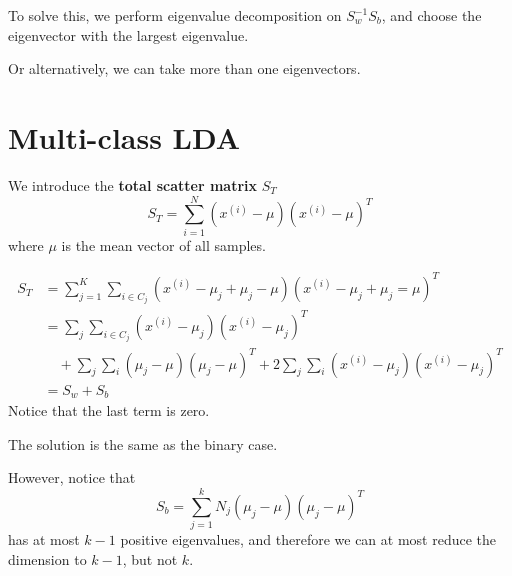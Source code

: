         To solve this, we perform eigenvalue decomposition on $S_w^{-1}S_b$, and choose the eigenvector with the largest eigenvalue.

        Or alternatively, we can take more than one eigenvectors.


\section{Multi-class LDA}
    We introduce the \textbf{total scatter matrix} $S_T$
    \[ S_T = \sum_{i=1}^N(x^{(i)}-\mu)(x^{(i)}-\mu)^T \]
    where $\mu$ is the mean vector of all samples.

    \begin{align*}
        S_T &= \sum_{j=1}^{K}\sum_{i\in C_j}(x^{(i)}-\mu_j+\mu_j-\mu)(x^{(i)}-\mu_j+\mu_j=\mu)^T\\
        &= \sum_j\sum_{i\in C_j}(x^{(i)}-\mu_j)(x^{(i)}-\mu_j)^T\\
        &\quad + \sum_j\sum_i(\mu_j-\mu)(\mu_j-\mu)^T + 2 \sum_j\sum_i(x^{(i)}-\mu_j)(x^{(i)}-\mu_j)^T\\
        &= S_w + S_b
    \end{align*}
    Notice that the last term is zero.

    The solution is the same as the binary case.

    However, notice that
    \[ S_b = \sum_{j=1}^k N_j(\mu_j-\mu)(\mu_j-\mu)^T \]
    has at most $k-1$ positive eigenvalues, and therefore we can at most reduce the dimension to $k-1$, but not $k$.
